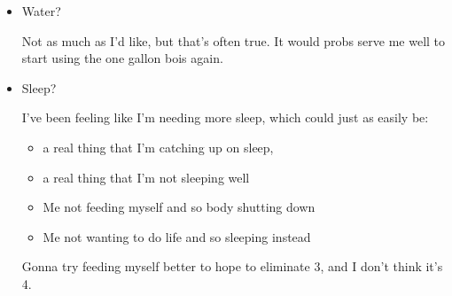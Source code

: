 \documentclass[12pt]{article}
\renewcommand{\,}{\textsuperscript{,}}
\begin{document}
\begin{itemize}
\begin{itemize}
\begin{itemize}
\end{itemize}

And then non-staples that I want to keep in home:

\begin{itemize}  
\item Carrot, celery, onion: chop and freeze for tossing in soup and the like  
\item Frozen pea: great way to quickly cool down soup or pasta  
\item Bacon ends: add nice flavor, cheapish and makes a meal with can of bean  
\item Potato? I'm not as sure about this one, haven't had great luck in the past, but in the past I've also ignored them for ages. Hard to say either way.  
\item Garlic  
\item Cooked protein: probably rotisserie chicken as a baseline, though if cheap cut of meat, can always do a gnaw of that as well or instead  
\item Cheese? Probably good  
\item Milk? Yogurt? Depends how smoothies go. I will make a smoothie once finished with this list  
\item Apple, non-frozen carrot: nummy nummy snack  
\item Other snacking foods  
\end{itemize}

Great, so don't want or need to get all of these things at once, but I can use this list to help me compile a list in the future.  
Also need to remember to look at dietary musings in the future for those things.

\item Water?

Not as much as I'd like, but that's often true. It would probs serve me well to start using the one gallon bois again.

\item Sleep?

I've been feeling like I'm needing more sleep, which could just as easily be:  
\begin{itemize}  
\item a real thing that I'm catching up on sleep,  
\item a real thing that I'm not sleeping well  
\item Me not feeding myself and so body shutting down  
\item Me not wanting to do life and so sleeping instead  
\end{itemize}  
Gonna try feeding myself better to hope to eliminate 3, and I don't think it's 4.


\end{itemize}
\end{itemize}
\end{document}
